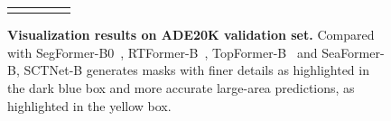 \documentclass[letterpaper]{article} %
\begin{document}
\begin{figure}[ht!]
{\begin{tabular}{ccccc}
 &  &  & &  \\
\end{tabular}

}

\caption{\textbf{Visualization results on ADE20K validation set.} Compared with SegFormer-B0~\cite{xie2021segformer}, RTFormer-B~\cite{wang2022rtformer}, TopFormer-B~\cite{zhang2022topformer} and SeaFormer-B\cite{wan2023seaformer}, SCTNet-B generates masks with finer details as highlighted in the dark blue box and more accurate large-area predictions, as highlighted in the yellow box.
    }
\label{suppfig:ADE_Visual}

\vspace{-10pt}
\end{figure}
\end{document}
